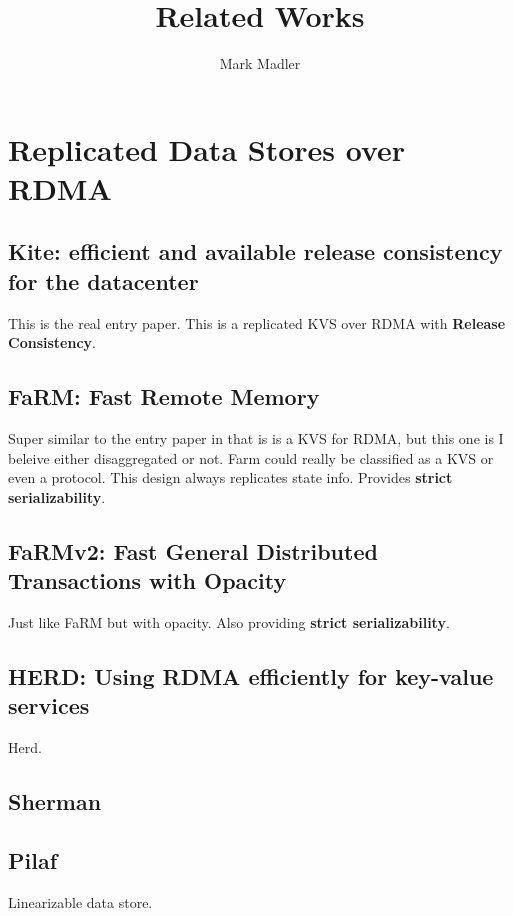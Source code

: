\documentclass[sigplan,nonacm]{acmart}
\title{Related Works}
\author{Mark Madler}
\begin{document}
\maketitle


\section{Replicated Data Stores over RDMA}

    \subsection{Kite: efficient and available release consistency for the datacenter}
    This is the real entry paper. This is a replicated KVS over RDMA with \textbf{Release Consistency}.\cite{Gavrielatos-PPoPP-2020} 

    \subsection{FaRM: Fast Remote Memory}
    Super similar to the entry paper in that is is a KVS for RDMA, but this one is I beleive either disaggregated or not. 
    Farm could really be classified as a KVS or even a protocol. This design always replicates state info. 
    Provides \textbf{strict serializability}.\cite{Dragojevic-NSDI-2014}

    \subsection{FaRMv2: Fast General Distributed Transactions with Opacity}
    Just like FaRM but with opacity. Also providing \textbf{strict serializability}.\cite{Shamis-SIGMOD-2019}

    \subsection{HERD: Using RDMA efficiently for key-value services}
    Herd.\cite {Kalia-SIGCOMM-2014}

    \subsection{Sherman }


    \subsection{Pilaf }
    Linearizable data store.
\end{document}
